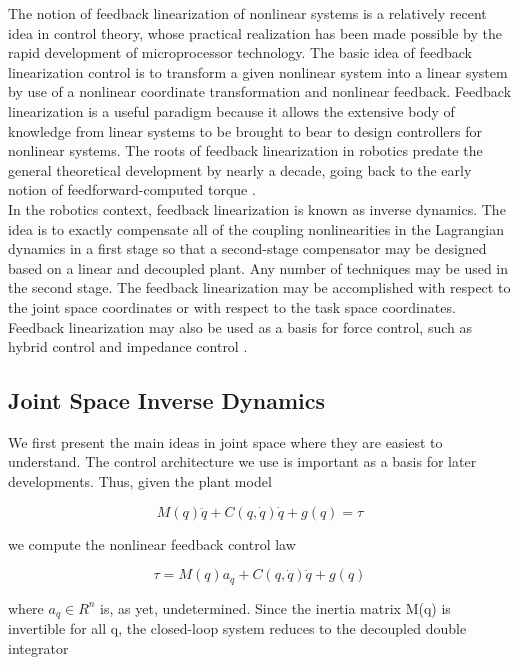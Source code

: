 \documentclass{UoNMCHA}
\numberwithin{equation}{section}
\begin{document}
	The notion of feedback linearization of nonlinear systems is a relatively recent idea in control theory, whose practical realization has been made possible by the rapid development of microprocessor technology. The basic idea of feedback linearization control is to transform a given nonlinear system into a linear system by use of a nonlinear coordinate transformation and nonlinear   feedback. Feedback linearization is a useful paradigm because it allows the extensive body of knowledge from linear systems to be brought to bear to design controllers for nonlinear systems. The roots of feedback linearization in robotics predate the general theoretical development by nearly a decade, going back to the early notion of feedforward-computed torque \cite{levine_1996_the}. \\
	
	In the robotics context, feedback linearization is known as inverse dynamics. The idea is to exactly compensate all of the coupling nonlinearities in the Lagrangian dynamics in a first stage so that a second-stage compensator may be designed based on a linear and decoupled plant. Any number of techniques may be used in the second stage. The feedback linearization may be   accomplished with respect to the joint space coordinates or with respect to the task space coordinates. Feedback linearization may also be used as a basis for force control, such as hybrid control and impedance control \cite{levine_1996_the}. 
	
	\subsection*{Joint Space Inverse Dynamics}
	
	
	We first present the main ideas in joint space where they are easiest to understand. The control architecture we use is important as a basis for later developments. Thus, given the plant model
	
	\begin{equation}\label{syseq}
	M(q)\ddot{q}+C(q,\dot{q})\dot{q}+g(q)=\tau
	\end{equation}
	
	we compute the nonlinear feedback control law
	
	\begin{equation}\label{feedbacklin}
	\tau = M(q)a_{q}+C(q,\dot{q})\dot{q}+g(q)
	\end{equation}
	
	\newpage
	where $a_q \in R^n$ is, as yet, undetermined. Since the inertia matrix M(q) is invertible for all q, the closed-loop system reduces to the decoupled double integrator  
	
\end{document}
